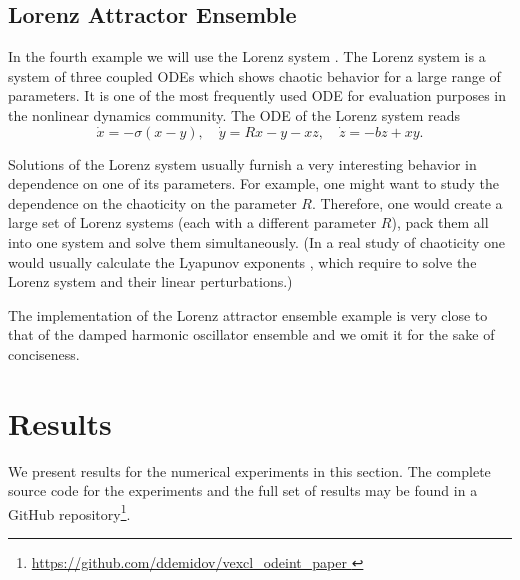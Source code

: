 \documentclass[final]{siamltex}
\begin{document}
%
%
\subsection{Lorenz Attractor Ensemble}

In the fourth example we will use the Lorenz system \cite{Lorenz-63}. The
Lorenz system is a system of three coupled ODEs which shows chaotic
behavior for a large range of parameters. It is one of the most frequently
used ODE for evaluation purposes in the nonlinear dynamics community.
The ODE of the Lorenz system reads
\begin{equation}
  \dot{x} = -\sigma \left( x - y \right), \quad 
  \dot{y} = R x - y - xz, \quad
  \dot{z} = -bz + xy.
  \label{eq:lorenz}
\end{equation}


Solutions of the Lorenz system usually furnish a very interesting
behavior in dependence on one of its parameters.  For example, one
might want to study the dependence on the chaoticity on the parameter
$R$. Therefore, one would create a large set of Lorenz systems (each
with a different parameter $R$), pack them all into one system and
solve them simultaneously. (In a real study of chaoticity one would
usually calculate the Lyapunov exponents \cite{Ott-book-02}, which
require to solve the Lorenz system and their linear perturbations.)


The implementation of the Lorenz attractor ensemble example is very close to
that of the damped harmonic oscillator ensemble and we omit it for the sake of
conciseness.



\section{Results}

We present results for the numerical experiments in this section. The complete
source code for the experiments and the full set of results may be found in a
GitHub repository\footnote{ \href{
https://github.com/ddemidov/vexcl_odeint_paper } {
https://github.com/ddemidov/vexcl\_odeint\_paper } }.

\end{document}
